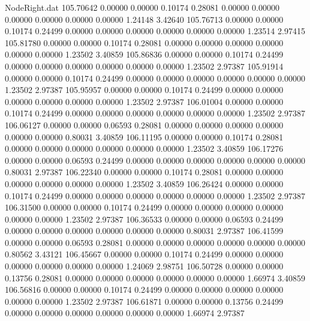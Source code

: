 \begin{filecontents}{NodeRight.dat}
 105.70642    0.00000    0.00000     0.10174    0.28081    0.00000    0.00000    0.00000    0.00000    0.00000    0.00000    1.24148    3.42640
 105.76713    0.00000    0.00000     0.10174    0.24499    0.00000    0.00000    0.00000    0.00000    0.00000    0.00000    1.23514    2.97415
 105.81780    0.00000    0.00000     0.10174    0.28081    0.00000    0.00000    0.00000    0.00000    0.00000    0.00000    1.23502    3.40859
 105.86836    0.00000    0.00000     0.10174    0.24499    0.00000    0.00000    0.00000    0.00000    0.00000    0.00000    1.23502    2.97387
 105.91914    0.00000    0.00000     0.10174    0.24499    0.00000    0.00000    0.00000    0.00000    0.00000    0.00000    1.23502    2.97387
 105.95957    0.00000    0.00000     0.10174    0.24499    0.00000    0.00000    0.00000    0.00000    0.00000    0.00000    1.23502    2.97387
 106.01004    0.00000    0.00000     0.10174    0.24499    0.00000    0.00000    0.00000    0.00000    0.00000    0.00000    1.23502    2.97387
 106.06127    0.00000    0.00000     0.06593    0.28081    0.00000    0.00000    0.00000    0.00000    0.00000    0.00000    0.80031    3.40859
 106.11195    0.00000    0.00000     0.10174    0.28081    0.00000    0.00000    0.00000    0.00000    0.00000    0.00000    1.23502    3.40859
 106.17276    0.00000    0.00000     0.06593    0.24499    0.00000    0.00000    0.00000    0.00000    0.00000    0.00000    0.80031    2.97387
 106.22340    0.00000    0.00000     0.10174    0.28081    0.00000    0.00000    0.00000    0.00000    0.00000    0.00000    1.23502    3.40859
 106.26424    0.00000    0.00000     0.10174    0.24499    0.00000    0.00000    0.00000    0.00000    0.00000    0.00000    1.23502    2.97387
 106.31500    0.00000    0.00000     0.10174    0.24499    0.00000    0.00000    0.00000    0.00000    0.00000    0.00000    1.23502    2.97387
 106.36533    0.00000    0.00000     0.06593    0.24499    0.00000    0.00000    0.00000    0.00000    0.00000    0.00000    0.80031    2.97387
 106.41599    0.00000    0.00000     0.06593    0.28081    0.00000    0.00000    0.00000    0.00000    0.00000    0.00000    0.80562    3.43121
 106.45667    0.00000    0.00000     0.10174    0.24499    0.00000    0.00000    0.00000    0.00000    0.00000    0.00000    1.24069    2.98751
 106.50728    0.00000    0.00000     0.13756    0.28081    0.00000    0.00000    0.00000    0.00000    0.00000    0.00000    1.66974    3.40859
 106.56816    0.00000    0.00000     0.10174    0.24499    0.00000    0.00000    0.00000    0.00000    0.00000    0.00000    1.23502    2.97387
 106.61871    0.00000    0.00000     0.13756    0.24499    0.00000    0.00000    0.00000    0.00000    0.00000    0.00000    1.66974    2.97387

\end{filecontents}
